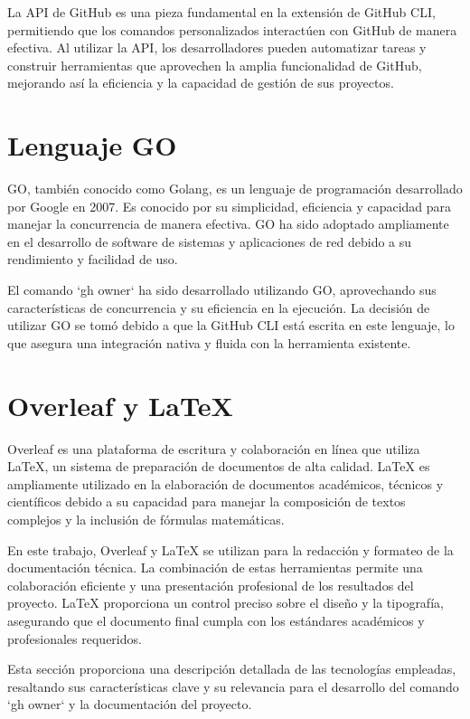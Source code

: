 La API de GitHub es una pieza fundamental en la extensión de GitHub CLI, permitiendo que los comandos personalizados interactúen con GitHub de manera efectiva. Al utilizar la API, los desarrolladores pueden automatizar tareas y construir herramientas que aprovechen la amplia funcionalidad de GitHub, mejorando así la eficiencia y la capacidad de gestión de sus proyectos.

\section{Lenguaje GO}
GO, también conocido como Golang, es un lenguaje de programación desarrollado por Google en 2007. Es conocido por su simplicidad, eficiencia y capacidad para manejar la concurrencia de manera efectiva. GO ha sido adoptado ampliamente en el desarrollo de software de sistemas y aplicaciones de red debido a su rendimiento y facilidad de uso.

El comando `gh owner` ha sido desarrollado utilizando GO, aprovechando sus características de concurrencia y su eficiencia en la ejecución. La decisión de utilizar GO se tomó debido a que la GitHub CLI está escrita en este lenguaje, lo que asegura una integración nativa y fluida con la herramienta existente.

\section{Overleaf y  \LaTeX{}}
Overleaf es una plataforma de escritura y colaboración en línea que utiliza  \LaTeX{}, un sistema de preparación de documentos de alta calidad.  \LaTeX{} es ampliamente utilizado en la elaboración de documentos académicos, técnicos y científicos debido a su capacidad para manejar la composición de textos complejos y la inclusión de fórmulas matemáticas.

En este trabajo, Overleaf y  \LaTeX{} se utilizan para la redacción y formateo de la documentación técnica. La combinación de estas herramientas permite una colaboración eficiente y una presentación profesional de los resultados del proyecto.  \LaTeX{} proporciona un control preciso sobre el diseño y la tipografía, asegurando que el documento final cumpla con los estándares académicos y profesionales requeridos.

Esta sección proporciona una descripción detallada de las tecnologías empleadas, resaltando sus características clave y su relevancia para el desarrollo del comando `gh owner` y la documentación del proyecto.